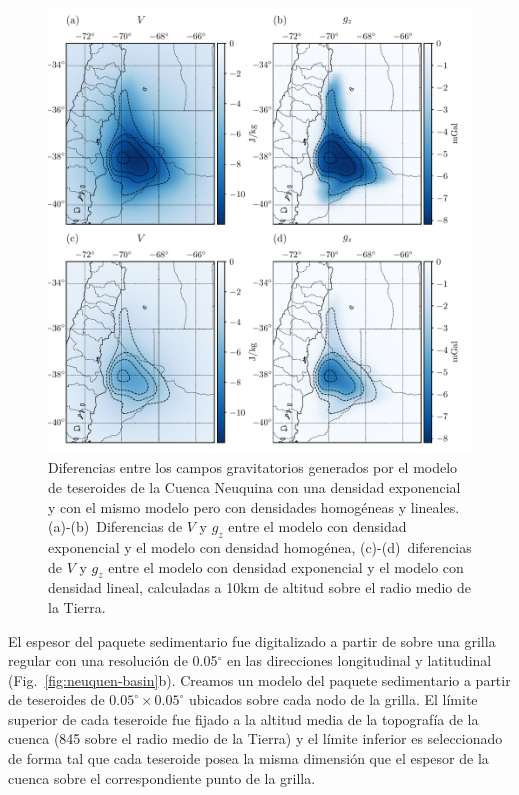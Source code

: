 \begin{figure}
\centering
\includegraphics[width=\linewidth]{figs/tesseroids-variable-density/neuquen-basin-diffs.pdf}
\caption{
    Diferencias entre los campos gravitatorios generados por el modelo de
    teseroides de la Cuenca Neuquina con una densidad exponencial y con el
    mismo modelo pero con densidades homogéneas y lineales.
    \mbox{(a)-(b)}~Diferencias de $V$ y $g_z$ entre el modelo con densidad
    exponencial y el modelo con densidad homogénea,
    \mbox{(c)-(d)}~diferencias de $V$ y $g_z$ entre el modelo con densidad
    exponencial y el modelo con densidad lineal,
    calculadas a 10km de altitud sobre el radio medio de la Tierra.
}
\label{fig:neuquen-basin-diffs}
\end{figure}

El espesor del paquete sedimentario fue digitalizado a partir de
\citet{heine2007} sobre una grilla regular con una resolución de 0.05$^\circ$
en las direcciones longitudinal y latitudinal (Fig.~\ref{fig:neuquen-basin}b).
Creamos un modelo del paquete sedimentario a partir de teseroides de
$0.05^\circ \times 0.05^\circ$ ubicados sobre cada nodo de la grilla.
El límite superior de cada teseroide fue fijado a la altitud media de la
topografía de la cuenca (845\m{} sobre el radio medio de la Tierra) y el límite
inferior es seleccionado de forma tal que cada teseroide posea la misma
dimensión que el espesor de la cuenca sobre el correspondiente punto de la
grilla.

